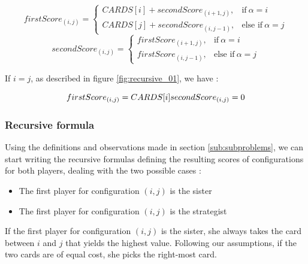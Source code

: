 \documentclass[a4paper,12pt,fleqn]{article}
\begin{document}
    \begin{equation}
    firstScore_{(i,j)} =    \begin{cases}
                                CARDS[i] + secondScore_{(i+1,j)}, & \text{if}\ \alpha=i \\
                                CARDS[j] + secondScore_{(i,j-1)}, & \text{else if}\ \alpha=j
                            \end{cases}
    \end{equation}
    \begin{equation} \label{eq:secondScore}
    secondScore_{(i,j)} =    \begin{cases}
                                firstScore_{(i+1,j)}, & \text{if}\ \alpha=i \\
                                firstScore_{(i,j-1)}, & \text{else if}\ \alpha=j
                            \end{cases}
    \end{equation}
    
If $i = j$, as described in figure \ref{fig:recursive_01}, we have :

    \begin{equation}
    firstScore_{(i,j)} = CARDS[i]
    \\
    secondScore_{(i,j)} = 0
    \end{equation}

\subsubsection{Recursive formula} \label{susub:recursive_formula}

Using the definitions and observations made in section \ref{sub:subproblems}, we can start writing the recursive formulas defining the resulting scores of configurations for both players, dealing with the two possible cases :

\begin{itemize}
    \item The first player for configuration $(i,j)$ is the sister
    \item The first player for configuration $(i,j)$ is the strategist
\end{itemize}

If the first player for configuration $(i,j)$ is the sister, she always takes the card between $i$ and $j$ that yields the highest value.
Following our assumptions, if the two cards are of equal cost, she picks the right-most card.
\end{document}
